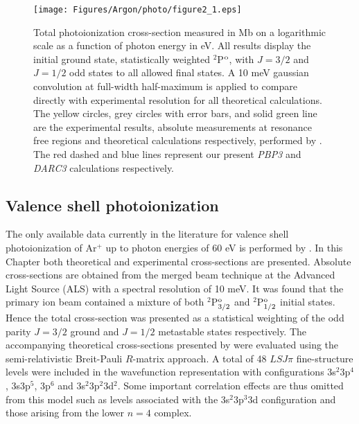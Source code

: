 %
\begin{sidewaysfigure}
\centering
    \texttt{[image: Figures/Argon/photo/figure2\_1.eps]}
\caption{Total photoionization cross-section measured in Mb on a logarithmic scale as a function of photon energy in eV. All results display the initial ground state, statistically weighted $^2$P$^{\rm o}$, with $J=3/2$ and $J=1/2$ odd states to all allowed final states. A 10 meV gaussian convolution at full-width half-maximum is applied to compare directly with experimental resolution for all theoretical calculations. The yellow circles, grey circles with error bars, and solid green line are the experimental results, absolute measurements at resonance free regions and theoretical calculations respectively, performed by \citet{2011PhRvA..84a3413C}. The red dashed and blue lines represent our present \textit{PBP3} and \textit{DARC3} calculations respectively. \label{fig:arg_ground}}
\end{sidewaysfigure}
%

\subsection{Valence shell photoionization}\label{sec:arg_valence}
The only available data currently in the literature for valence shell photoionization of Ar$^{+}$ up to photon energies of 60 eV is performed by \citet{2011PhRvA..84a3413C}. In this Chapter both theoretical and experimental cross-sections are presented. Absolute cross-sections are obtained from the merged beam technique at the Advanced Light Source (ALS) with a spectral resolution of 10 meV. It was found that the primary ion beam contained a mixture of both $^2$P$_{3/2}^{\rm o}$ and $^2$P$_{1/2}^{\rm o}$ initial states. Hence the total cross-section was presented as a statistical weighting of the odd parity $J=3/2$ ground and $J=1/2$ metastable states respectively. The accompanying theoretical cross-sections presented by \citet{2011PhRvA..84a3413C} were evaluated using the semi-relativistic Breit-Pauli $R$-matrix approach. A total of 48 $LSJ\pi$ fine-structure levels were included in the wavefunction representation with configurations 3s$^2$3p$^4$, 3s3p$^5$, 3p$^6$ and 3s$^2$3p$^2$3d$^2$. Some important correlation effects are thus omitted from this model such as levels associated with the 3s$^2$3p$^3$3d configuration and those arising from the lower $n=4$ complex. 

